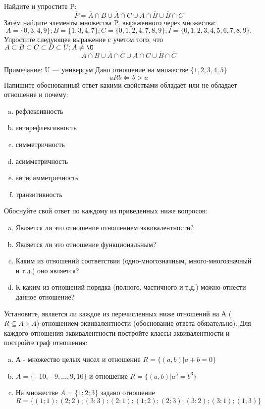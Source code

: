 \documentclass[10pt]{exam}
\begin{document}
\begin{questions}
\question
Найдите и упростите P:
\begin{equation*}
\overline{P} = \overline{A} \cap B \cup \overline{A} \cap C \cup A \cap \overline{B} \cup \overline{B} \cap C
\end{equation*}
Затем найдите элементы множества P, выраженного через множества:
\begin{equation*}
A = \{0, 3, 4, 9\}; 
B = \{1, 3, 4, 7\};
C = \{0, 1, 2, 4, 7, 8, 9\};
I = \{0, 1, 2, 3, 4, 5, 6, 7, 8, 9\}.
\end{equation*}\question
Упростите следующее выражение с учетом того, что $A\subset B \subset C \subset D \subset U; A \neq \O$
\begin{equation*}
A \cap B \cup \overline{A} \cap \overline{C} \cup A \cap C \cup \overline{B} \cap \overline{C}
\end{equation*}

Примечание: U — универсум\question
Дано отношение на множестве $\{1, 2, 3, 4, 5\}$ 
\begin{equation*}
aRb \iff b > a
\end{equation*}
Напишите обоснованный ответ какими свойствами обладает или не обладает отношение и почему:   
\begin{enumerate} [a)]\setcounter{enumi}{0}
\item рефлексивность
\item антирефлексивность
\item симметричность
\item асимметричность
\item антисимметричность
\item транзитивность
\end{enumerate}

Обоснуйте свой ответ по каждому из приведенных ниже вопросов:
\begin{enumerate} [a)]\setcounter{enumi}{0}
    \item Является ли это отношение отношением эквивалентности?
    \item Является ли это отношение функциональным?
    \item Каким из отношений соответствия (одно-многозначным, много-многозначный и т.д.) оно является?
    \item К каким из отношений порядка (полного, частичного и т.д.) можно отнести данное отношение?
\end{enumerate}

\question
Установите, является ли каждое из перечисленных ниже отношений на А ($R \subseteq A \times A$) отношением эквивалентности (обоснование ответа обязательно). Для каждого отношения эквивалентности 
постройте классы эквивалентности и постройте граф отношения:
\begin{enumerate}[a)]\setcounter{enumi}{0}
\item А - множество целых чисел и отношение $R = \{(a,b)|a + b = 0\}$
\item $A = \{-10, -9, …, 9, 10\}$ и отношение $R = \{(a,b)|a^{3} = b^{3}\}$
\item На множестве $A = \{1; 2; 3\}$ задано отношение $R = \{(1; 1); (2; 2); (3; 3); (2; 1); (1; 2); (2; 3); (3; 2); (3; 1); (1; 3)\}$


\end{enumerate}
\end{questions}
\end{document}
